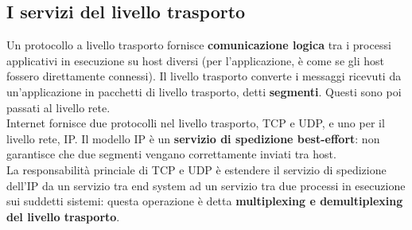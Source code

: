 \documentclass[11pt]{article}
\begin{document}
\subsection{I servizi del livello trasporto} 
Un protocollo a livello trasporto fornisce \textbf{comunicazione logica} tra i processi applicativi in esecuzione su host 
diversi (per l'applicazione, è come se gli host fossero direttamente connessi). Il livello trasporto converte i messaggi
ricevuti da un'applicazione in pacchetti di livello trasporto, detti \textbf{segmenti}. Questi sono poi passati al
livello rete.\\
Internet fornisce due protocolli nel livello trasporto, TCP e UDP, e uno per il livello rete, IP. Il modello IP è un 
\textbf{servizio di spedizione best-effort}: non garantisce che due segmenti vengano correttamente inviati tra host.\\
La responsabilità princiale di TCP e UDP è estendere il servizio di spedizione dell'IP da un servizio tra end system ad 
un servizio tra due processi in esecuzione sui suddetti sistemi: questa operazione è detta \textbf{multiplexing e 
demultiplexing del livello trasporto}.
\end{document}
